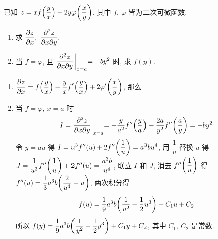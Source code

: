 \begin{example}
    已知 $z=xf\qty(\dfrac{y}{x})+2y\varphi\qty(\dfrac{x}{y})$, 其中 $f,~\varphi$ 皆为二次可微函数.
    \begin{enumerate}[label=(\arabic{*})]
        \item 求 $\displaystyle \pdv{z}{x},~\pdv{z}{x}{y}.$
        \item 当 $f=\varphi$, 且 $\displaystyle \pdv{z}{x}{y}\biggl |_{x=a}=-by^2$ 时, 求 $f(y).$
    \end{enumerate}
\end{example}
\begin{solution}
    \begin{enumerate}[label=(\arabic{*})]
        \item $\displaystyle\pdv{z}{x}=f\qty(\dfrac{y}{x})-\dfrac{y}{x}f'\qty(\dfrac{y}{x})+2\varphi'\qty(\dfrac{x}{y})$, 那么
        \item 当 $f=\varphi,~x=a$ 时
              $$I=\pdv{z}{x}{y}\biggl |_{x=a}=-\dfrac{y}{a^2}f''\qty(\dfrac{y}{a})-\dfrac{2a}{y^2}f''\qty(\dfrac{a}{y})=-by^2$$
              令 $y=au$ 得 $\displaystyle I=u^3f''(u)+2f''\qty(\dfrac{1}{u})=a^3bu^4$, 用 $\dfrac{1}{u}$ 替换 $u$ 得 $J=\dfrac{1}{u^3}f''\qty(\dfrac{1}{u})+2f''(u)=\dfrac{a^3b}{u^4}$, 
              联立 $I$ 和 $J$, 消去 $f''\qty(\dfrac{1}{u})$ 得 $f''(u)=\dfrac{1}{3}a^3b\qty(\dfrac{2}{u^4}-u)$, 两次积分得
              $$f(u)=\dfrac{1}{9}a^3b\qty(\dfrac{1}{u^2}-\dfrac{1}{2}u^3)+C_1u+C_2$$
              所以 $\displaystyle f(y)=\dfrac{1}{9}a^3b\qty(\dfrac{1}{y^2}-\dfrac{1}{2}y^3)+C_1y+C_2$, 其中 $C_1,~C_2$ 是常数.
    \end{enumerate}
\end{solution}


